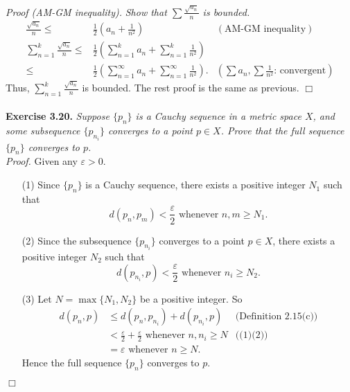 \documentclass{article}
\begin{document}
\emph{Proof (AM-GM inequality).}
\emph{Show that $\sum\frac{\sqrt{a_n}}{n}$ is bounded.}
\begin{align*}
\frac{\sqrt{a_n}}{n}
\leq&
\frac{1}{2}
\left( a_n + \frac{1}{n^2} \right)
  &(\text{AM-GM inequality}) \\
\sum_{n=1}^{k} \frac{\sqrt{a_n}}{n}
\leq&
\frac{1}{2}
\left( \sum_{n=1}^{k} a_n + \sum_{n=1}^{k} \frac{1}{n^2} \right) \\
\leq&
\frac{1}{2}
\left( \sum_{n=1}^{\infty} a_n + \sum_{n=1}^{\infty} \frac{1}{n^2} \right).
  &\left(\text{$\sum{a_n}, \sum{\frac{1}{n^2}}$: convergent}\right)
\end{align*}
Thus, $\sum_{n=1}^{k}\frac{\sqrt{a_n}}{n}$ is bounded.
The rest proof is the same as previous.
$\Box$ \\\\






\textbf{Exercise 3.20.}
\emph{Suppose $\{p_n\}$ is a Cauchy sequence in a metric space $X$,
and some subsequence $\{p_{n_i}\}$ converges to a point $p \in X$.
Prove that the full sequence $\{p_n\}$ converges to $p$. } \\

\emph{Proof.}
Given any $\varepsilon > 0$.
\begin{enumerate}
\item[(1)]
Since $\{p_n\}$ is a Cauchy sequence, there exists a positive integer $N_1$ such that
$$d(p_n,p_m) < \frac{\varepsilon}{2} \text{ whenever } n, m \geq N_1.$$
\item[(2)]
Since the subsequence $\{p_{n_i}\}$ converges to a point $p \in X$,
there exists a positive integer $N_2$ such that
$$d(p_{n_i},p) < \frac{\varepsilon}{2} \text{ whenever } n_i \geq N_2.$$
\item[(3)]
Let $N = \max\{N_1, N_2\}$ be a positive integer.
So
\begin{align*}
d(p_n,p)
&\leq d(p_n,p_{n_i}) + d(p_{n_i}, p)
  &\text{(Definition 2.15(c))} \\
&< \frac{\varepsilon}{2} + \frac{\varepsilon}{2} \text{ whenever } n, n_i \geq N
  &\text{((1)(2))} \\
&= \varepsilon \text{ whenever } n \geq N.
\end{align*}
Hence the full sequence $\{p_n\}$ converges to $p$.
\end{enumerate}
$\Box$ \\\\
\end{document}
